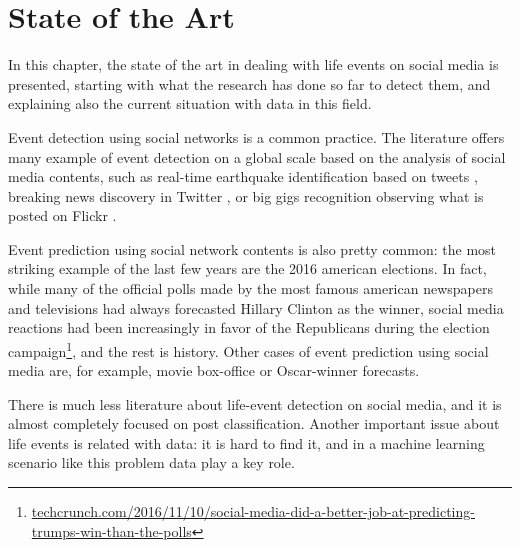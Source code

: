 \chapter{State of the Art}
\label{cha:soa}

In this chapter, the state of the art in dealing with life events on social media is presented, starting with what the research has done so far to detect them, and explaining also the current situation with data in this field.

Event detection using social networks is a common practice. The literature offers many example of event detection on a global scale based on the analysis of social media contents, such as real-time earthquake identification based on tweets \cite{sakaki2010earthquake}, breaking news discovery in Twitter \cite{jackoway2011identification, phuvipadawat2010breaking}, or big gigs recognition observing what is posted on Flickr \cite{liu2011using}.

Event prediction using social network contents is also pretty common: the most striking example of the last few years are the 2016 american elections. In fact, while many of the official polls made by the most famous american newspapers and televisions had always forecasted Hillary Clinton as the winner, social media reactions had been increasingly in favor of the Republicans during the election campaign\footnote{\url{techcrunch.com/2016/11/10/social-media-did-a-better-job-at-predicting-trumps-win-than-the-polls}}, and the rest is history. Other cases of event prediction using social media are, for example, movie box-office \cite{asur2010predicting} or Oscar-winner forecasts.

There is much less literature about life-event detection on social media, and it is almost completely focused on post classification. Another important issue about life events is related with data: it is hard to find it, and in a machine learning scenario like this problem data play a key role.

